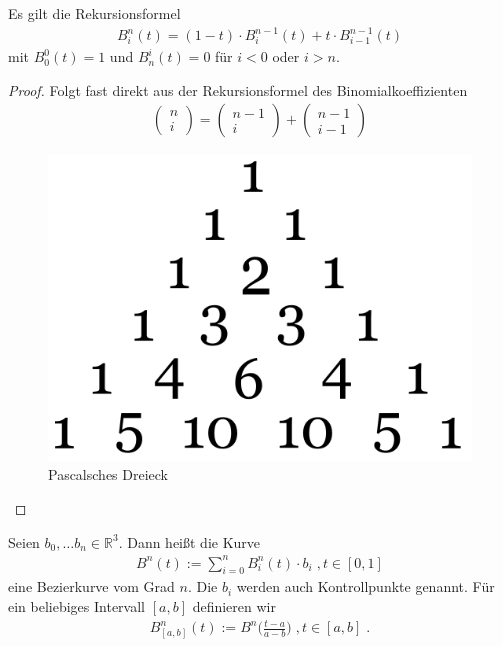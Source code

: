 \begin{Satz}
Es gilt die Rekursionsformel
\begin{align*}
B_i^n(t) = (1-t) \cdot B^{n-1}_{i}(t) + t \cdot B^{n-1}_{i-1}(t)
\end{align*}
mit $B^0_0(t) = 1$ und $B^i_n(t) = 0$ für $i<0$ oder $i>n$.
\end{Satz}
\begin{proof}
Folgt fast direkt aus der Rekursionsformel des Binomialkoeffizienten
\begin{align*}
\begin{pmatrix} n \\ i \end{pmatrix} = \begin{pmatrix} n-1 \\ i \end{pmatrix} + \begin{pmatrix} n-1 \\ i-1 \end{pmatrix} 
\end{align*}
\begin{figure}[H]
    \centering
    \includegraphics[scale=0.2]{images/pascal.png}
    \caption{Pascalsches Dreieck}
    \label{fig:pascals-triangle}
\end{figure}
\end{proof}


\begin{Definition}
Seien $b_0, \hdots b_n \in \mathbb{R}^3$. Dann heißt die Kurve
\begin{align*}
B^n(t) := \sum_{i = 0}^{n} B_i^n(t) \cdot  b_i \; , t \in [0,1] 
\end{align*} 
eine Bezierkurve vom Grad $n$. Die $b_i$ werden auch Kontrollpunkte genannt.
Für ein beliebiges Intervall $[a,b]$ definieren wir
\begin{align*}
B^n_{[a,b]} (t):=  B^n\biggl( \frac{t-a }{a-b} \biggr) \; , t \in [a,b] \; .
\end{align*} 
\end{Definition}


